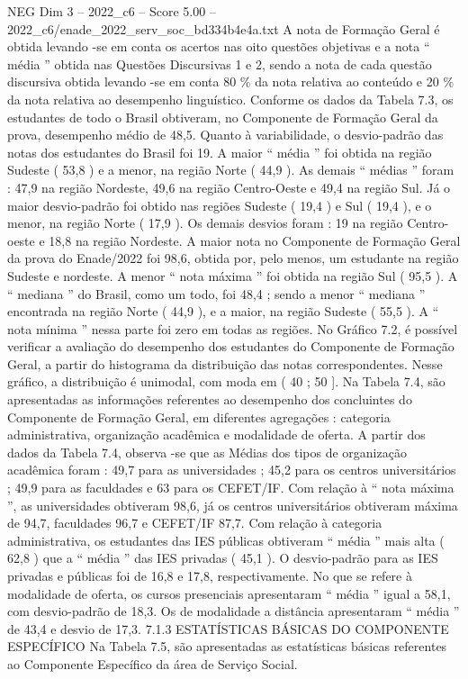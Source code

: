 \begin{textsample}{NEG Dim 3 – 2022\_c6 – Score 5.00 – 2022\_c6/enade\_2022\_serv\_soc\_bd334b4e4a.txt}
A nota de Formação Geral é obtida levando -se em conta os acertos nas oito questões objetivas e a nota “ média ” obtida nas Questões Discursivas 1 e 2, sendo a nota de cada questão discursiva obtida levando -se em conta 80 \% da nota relativa ao conteúdo e 20 \% da nota relativa ao desempenho linguístico.
Conforme os dados da Tabela 7.3, os estudantes de todo o Brasil obtiveram, no Componente de Formação Geral da prova, desempenho médio de 48,5.
Quanto à variabilidade, o desvio-padrão das notas dos estudantes do Brasil foi 19.
A maior “ média ” foi obtida na região Sudeste ( 53,8 ) e a menor, na região Norte ( 44,9 ).
As demais “ médias ” foram : 47,9 na região Nordeste, 49,6 na região Centro-Oeste e 49,4 na região Sul.
Já o maior desvio-padrão foi obtido nas regiões Sudeste ( 19,4 ) e Sul ( 19,4 ), e o menor, na região Norte ( 17,9 ).
Os demais desvios foram : 19 na região Centro-oeste e 18,8 na região Nordeste.
A maior nota no Componente de Formação Geral da prova do Enade/2022 foi 98,6, obtida por, pelo menos, um estudante na região Sudeste e nordeste.
A menor “ nota máxima ” foi obtida na região Sul ( 95,5 ).
A “ mediana ” do Brasil, como um todo, foi 48,4 ; sendo a menor “ mediana ” encontrada na região Norte ( 44,9 ), e a maior, na região Sudeste ( 55,5 ).
A “ nota mínima ” nessa parte foi zero em todas as regiões.
No Gráfico 7.2, é possível verificar a avaliação do desempenho dos estudantes do Componente de Formação Geral, a partir do histograma da distribuição das notas correspondentes.
Nesse gráfico, a distribuição é unimodal, com moda em ( 40 ; 50 ].
Na Tabela 7.4, são apresentadas as informações referentes ao desempenho dos concluintes do Componente de Formação Geral, em diferentes agregações : categoria administrativa, organização acadêmica e modalidade de oferta.
A partir dos dados da Tabela 7.4, observa -se que as Médias dos tipos de organização acadêmica foram : 49,7 para as universidades ; 45,2 para os centros universitários ; 49,9 para as faculdades e 63 para os CEFET/IF.
Com relação à “ nota máxima ”, as universidades obtiveram 98,6, já os centros universitários obtiveram máxima de 94,7, faculdades 96,7 e CEFET/IF 87,7.
Com relação à categoria administrativa, os estudantes das IES públicas obtiveram “ média ” mais alta ( 62,8 ) que a “ média ” das IES privadas ( 45,1 ).
O desvio-padrão para as IES privadas e públicas foi de 16,8 e 17,8, respectivamente.
No que se refere à modalidade de oferta, os cursos presenciais apresentaram “ média ” igual a 58,1, com desvio-padrão de 18,3.
Os de modalidade a distância apresentaram “ média ” de 43,4 e desvio de 17,3. 7.1.3 ESTATÍSTICAS BÁSICAS DO COMPONENTE ESPECÍFICO Na Tabela 7.5, são apresentadas as estatísticas básicas referentes ao Componente Específico da área de Serviço Social.

\end{textsample}
